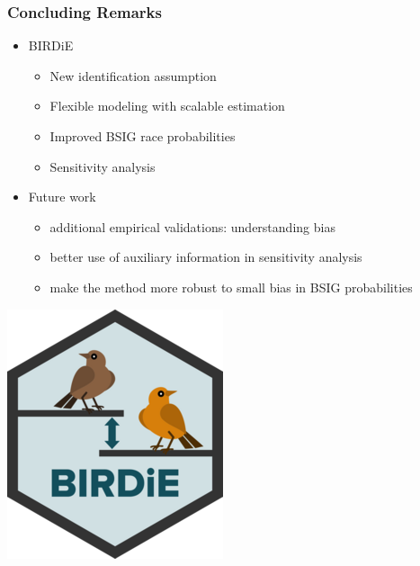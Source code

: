 \documentclass{beamer}
\begin{document}
\begin{frame}

  \frametitle{Concluding Remarks}

  \begin{itemize}
  \item BIRDiE
    \begin{itemize}
    \item New identification assumption
    \item Flexible modeling with scalable estimation
    \item Improved BSIG race probabilities
    \item Sensitivity analysis
    \end{itemize}
    \vfill

  \item Future work
    \begin{itemize}
    \item additional empirical validations: understanding bias
    \item better use of auxiliary information in sensitivity analysis
    \item make the method more robust to small bias in BSIG probabilities

    \end{itemize}
  \end{itemize}

  \vfill
  \vspace{-.7in}
  \begin{flushright}
     \includegraphics[scale=0.165]{../man/figures/logo.png}
  \end{flushright}
\end{frame}
\end{document}
